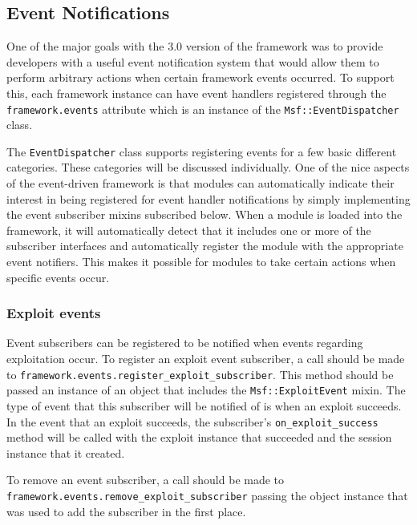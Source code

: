 \documentclass{report}
\begin{document}
        \subsection{Event Notifications}

\par
One of the major goals with the 3.0 version of the framework was to
provide developers with a useful event notification system that
would allow them to perform arbitrary actions when certain framework
events occurred.  To support this, each framework instance can have
event handlers registered through the \texttt{framework.events}
attribute which is an instance of the \texttt{Msf::EventDispatcher}
class.

\par
The \texttt{EventDispatcher} class supports registering events for a
few basic different categories.  These categories will be discussed
individually.  One of the nice aspects of the event-driven framework
is that modules can automatically indicate their interest in being
registered for event handler notifications by simply implementing
the event subscriber mixins subscribed below.  When a module is
loaded into the framework, it will automatically detect that it
includes one or more of the subscriber interfaces and automatically
register the module with the appropriate event notifiers.  This
makes it possible for modules to take certain actions when specific
events occur.

            \subsubsection{Exploit events}

\par
Event subscribers can be registered to be notified when events
regarding exploitation occur.  To register an exploit event
subscriber, a call should be made to
\texttt{framework.events.register\_exploit\_subscriber}.  This
method should be passed an instance of an object that includes the
\texttt{Msf::ExploitEvent} mixin.  The type of event that this
subscriber will be notified of is when an exploit succeeds.  In the
event that an exploit succeeds, the subscriber's
\texttt{on\_exploit\_success} method will be called with the exploit
instance that succeeded and the session instance that it created.

\par
To remove an event subscriber, a call should be made to\\
\texttt{framework.events.remove\_exploit\_subscriber} passing the
object instance that was used to add the subscriber in the first
place.
\end{document}
